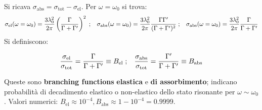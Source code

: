 \documentclass[10pt, a4paper]{scrartcl}
\numberwithin{equation}{subsection}
\theoremstyle{style1}
\newenvironment{boxenv}[1][]{
    \begin{eqbox}[#1]
    }{
   \end{eqbox}
}
\begin{document}
\noindent Si ricava $\sigma _\text{abs}= \sigma _{\text{tot}} - \sigma _\text{el}$. Per $\omega = \omega_0$ si trova:
\[
	\sigma _\text{el} (\omega=\omega_0) = \frac{3\lambda _0^2}{2\pi} \left(\frac{\Gamma}{\Gamma+\Gamma'}\right) ^2 \hspace{.1cm} ; \hspace{.3cm} \sigma _\text{abs} (\omega= \omega_0 )= \frac{3 \lambda _0^2}{2\pi} \frac{\Gamma \Gamma'}{(\Gamma + \Gamma')^2}\hspace{.1cm} ; \hspace{.3cm} \sigma _\text{abs} (\omega= \omega_0 )= \frac{3 \lambda _0^2}{2\pi} \frac{\Gamma }{\Gamma + \Gamma'}
\] 
Si definiscono:
\begin{boxenv}[]
\begin{equation}
	\frac{\sigma _\text{el}}{\sigma _\text{tot}} = \frac{\Gamma}{\Gamma + \Gamma'} \equiv B_\text{el} \hspace{.1cm} ; \hspace{.3cm} \frac{\sigma _\text{abs}}{\sigma _\text{tot}} = \frac{\Gamma'}{\Gamma+\Gamma'}\equiv B_\text{abs}
\end{equation}
\end{boxenv}
\noindent Queste sono \textbf{branching functions} \textbf{elastica} e \textbf{di assorbimento}; indicano probabilit\`a di decadimento elastico o non-elastico dello stato risonante per $\omega\sim \omega_0$. Valori numerici: $B_\text{el} \approx 10^{-4}, B_\text{abs} \approx 1-10^{-4} = 0.9999 $.
\end{document}
